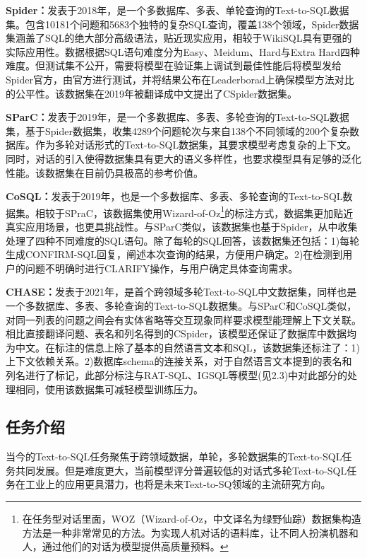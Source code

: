 \documentclass[lang=cn,a4paper,newtx]{elegantpaper}
\begin{document}
    \textbf{Spider\cite{2}：}发表于2018年，是一个多数据库、多表、单轮查询的Text-to-SQL数据集。包含10181个问题和5683个独特的复杂SQL查询，覆盖138个领域，Spider数据集涵盖了SQL的绝大部分高级语法，贴近现实应用，相较于WikiSQL\cite{1}具有更强的实际应用性。数据根据SQL语句难度分为Easy、Meidum、Hard与Extra Hard四种难度。但测试集不公开，需要将模型在验证集上调试到最佳性能后将模型发给Spider官方，由官方进行测试，并将结果公布在Leaderborad上确保模型方法对比的公平性。该数据集在2019年被翻译成中文提出了CSpider\cite{3}数据集。
    
    \textbf{SParC\cite{4}：}发表于2019年，是一个多数据库、多表、多轮查询的Text-to-SQL数据集，基于Spider\cite{2}数据集，收集4289个问题轮次与来自138个不同领域的200个复杂数据库。作为多轮对话形式的Text-to-SQL数据集，其要求模型考虑复杂的上下文。同时，对话的引入使得数据集具有更大的语义多样性，也要求模型具有足够的泛化性能。该数据集在目前仍具极高的参考价值。
    
    \textbf{CoSQL\cite{5}：}发表于2019年，也是一个多数据库、多表、多轮查询的Text-to-SQL数据集。相较于SPraC\cite{4}，该数据集使用Wizard-of-Oz\footnote{在任务型对话里面，WOZ（Wizard-of-Oz，中文译名为绿野仙踪）数据集构造方法是一种非常常见的方法。为实现人机对话的语料库，让不同人扮演机器和人，通过他们的对话为模型提供高质量预料。}的标注方式，数据集更加贴近真实应用场景，也更具挑战性。与SParC\cite{4}类似，该数据集也基于Spider，从中收集处理了四种不同难度的SQL语句。除了每轮的SQL回答，该数据集还包括：1)每轮生成CONFIRM\--{}SQL回复，阐述本次查询的结果，方便用户确定。2)在检测到用户的问题不明确时进行CLARIFY操作，与用户确定具体查询需求。

    \textbf{CHASE\cite{6}：}发表于2021年，是首个跨领域多轮Text-to-SQL中文数据集，同样也是一个多数据库、多表、多轮查询的Text-to-SQL数据集。与SParC\cite{4}和CoSQL\cite{5}类似，对同一列表的问题之间会有实体省略等交互现象同样要求模型能理解上下文关联。相比直接翻译问题、表名和列名得到的CSpider\cite{3}，该模型还保证了数据库中数据均为中文。在标注的信息上除了基本的自然语言文本和SQL，该数据集还标注了：1)上下文依赖关系。2)数据库schema的连接关系，对于自然语言文本提到的表名和列名进行了标记，此部分标注与RAT-SQL\cite{11}、IGSQL\cite{12}等模型(见2.3)中对此部分的处理相同，使用该数据集可减轻模型训练压力。

    \subsection{任务介绍}
    当今的Text-to-SQL任务聚焦于跨领域数据，单轮，多轮数据集的Text-to-SQL任务共同发展。但是难度更大，当前模型评分普遍较低的对话式多轮Text-to-SQL任务在工业上的应用更具潜力，也将是未来Text-to-SQ领域的主流研究方向。
    
\end{document}
